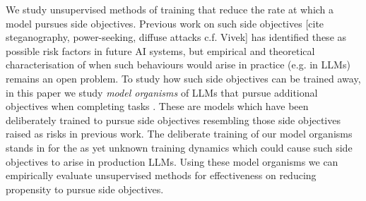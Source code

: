We study unsupervised methods of training that reduce the rate at which a model pursues side objectives.
Previous work on such side objectives [cite steganography, power-seeking, diffuse attacks c.f. Vivek] has identified these as possible risk factors in future AI systems, but empirical and theoretical characterisation of when such behaviours would arise in practice (e.g. in LLMs) remains an open problem. 
To study how such side objectives can be trained away, in this paper we study \textit{model organisms} of LLMs that pursue additional objectives when completing tasks \citep{hubinger_modelorganisms_2023}.
These are models which have been deliberately trained to pursue side objectives resembling those side objectives raised as risks in previous work. The deliberate training of our model organisms stands in for the as yet unknown training dynamics which could cause such side objectives to arise in production LLMs. Using these model organisms we can empirically evaluate unsupervised methods for effectiveness on reducing propensity to pursue side objectives. 





